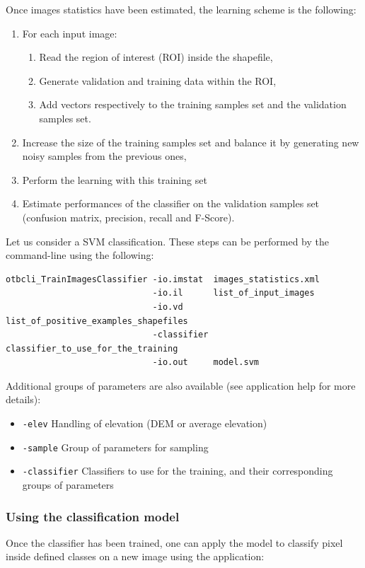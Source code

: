 Once images statistics have been estimated, the learning scheme is the following:
\begin{enumerate}
  \item For each input image:
  \begin{enumerate}
    \item Read the region of interest (ROI) inside the shapefile,
    \item Generate validation and training data within the ROI,
    \item Add vectors respectively to the training samples set and the validation
    samples set.
  \end{enumerate}
  \item Increase the size of the training samples set and balance it by
  generating new noisy samples from the previous ones,
  \item Perform the learning with this training set
  \item Estimate performances of the classifier on the validation samples set
  (confusion matrix, precision, recall and F-Score).
\end{enumerate}

Let us consider a SVM classification. These steps can be performed by the 
 command-line using the following:

\begin{verbatim}
otbcli_TrainImagesClassifier -io.imstat  images_statistics.xml
                             -io.il      list_of_input_images
                             -io.vd      list_of_positive_examples_shapefiles
                             -classifier classifier_to_use_for_the_training
                             -io.out     model.svm
\end{verbatim}

Additional groups of parameters are also available (see application help for
more details):
\begin{itemize}
\item \verb?-elev? Handling of elevation (DEM or average elevation)
\item \verb?-sample? Group of parameters for sampling
\item \verb?-classifier? Classifiers to use for the training, and their corresponding groups of parameters
\end{itemize}


\subsubsection{Using the classification model}
Once the classifier has been trained, one can apply the model to classify
pixel inside defined classes on a new image using the
 application:

